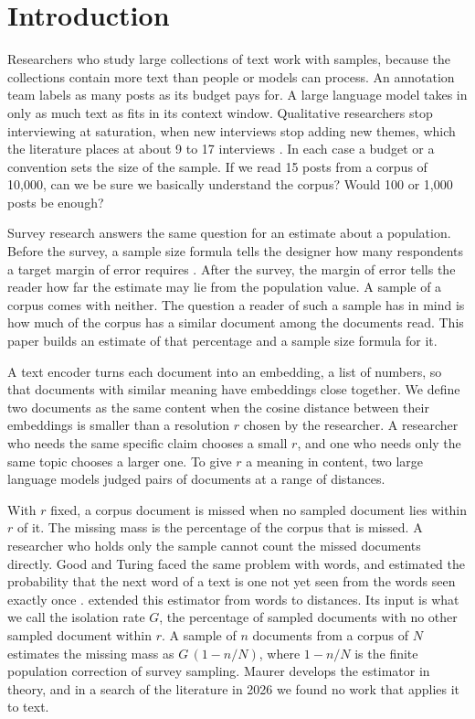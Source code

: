 \section{Introduction}

Researchers who study large collections of text work with samples, because the collections contain more text than people or models can process. An annotation team labels as many posts as its budget pays for. A large language model takes in only as much text as fits in its context window. Qualitative researchers stop interviewing at saturation, when new interviews stop adding new themes, which the literature places at about 9 to 17 interviews \citep{guest2006,hennink2022}. In each case a budget or a convention sets the size of the sample. If we read 15 posts from a corpus of 10{,}000, can we be sure we basically understand the corpus? Would 100 or 1{,}000 posts be enough?

Survey research answers the same question for an estimate about a population. Before the survey, a sample size formula tells the designer how many respondents a target margin of error requires \citep{cochran1977,kish1965}. After the survey, the margin of error tells the reader how far the estimate may lie from the population value. A sample of a corpus comes with neither. The question a reader of such a sample has in mind is how much of the corpus has a similar document among the documents read. This paper builds an estimate of that percentage and a sample size formula for it.

A text encoder turns each document into an embedding, a list of numbers, so that documents with similar meaning have embeddings close together. We define two documents as the same content when the cosine distance between their embeddings is smaller than a resolution $r$ chosen by the researcher. A researcher who needs the same specific claim chooses a small $r$, and one who needs only the same topic chooses a larger one. To give $r$ a meaning in content, two large language models judged pairs of documents at a range of distances.

With $r$ fixed, a corpus document is missed when no sampled document lies within $r$ of it. The missing mass is the percentage of the corpus that is missed. A researcher who holds only the sample cannot count the missed documents directly. Good and Turing faced the same problem with words, and estimated the probability that the next word of a text is one not yet seen from the words seen exactly once \citep{good1953}. \citet{maurer2022missing} extended this estimator from words to distances. Its input is what we call the isolation rate $G$, the percentage of sampled documents with no other sampled document within $r$. A sample of $n$ documents from a corpus of $N$ estimates the missing mass as $G\,(1 - n/N)$, where $1 - n/N$ is the finite population correction of survey sampling. Maurer develops the estimator in theory, and in a search of the literature in 2026 we found no work that applies it to text.

